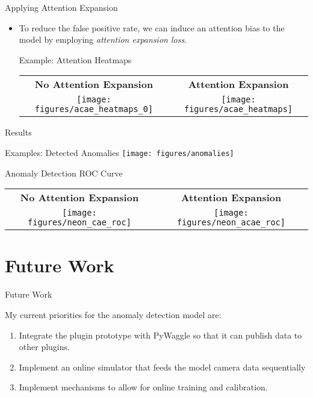\documentclass[10pt]{beamer}
\begin{document}
\begin{frame}{Applying Attention Expansion}

\begin{itemize}
\item To reduce the false positive rate, we can induce an attention bias to the model by employing \textit{attention expansion loss}.\\[0.5cm]

\begin{exampleblock}{Example: Attention Heatmaps}
\begin{tabular}{c | c}
\textbf{No Attention Expansion} & \textbf{Attention Expansion}\\
\texttt{[image: figures/acae\_heatmaps\_0]} & \texttt{[image: figures/acae\_heatmaps]}
\end{tabular}
\end{exampleblock}
\end{itemize}
\end{frame}

\begin{frame}{Results}
\begin{exampleblock}{Examples: Detected Anomalies}
\texttt{[image: figures/anomalies]}
\end{exampleblock}

\begin{exampleblock}{Anomaly Detection ROC Curve}
\begin{tabular}{c | c}
\textbf{No Attention Expansion} & \textbf{Attention Expansion}\\
\texttt{[image: figures/neon\_cae\_roc]} & \texttt{[image: figures/neon\_acae\_roc]}
\end{tabular}
\end{exampleblock}
\end{frame}


\section{Future Work}


\begin{frame}{Future Work}


My current priorities for the anomaly detection model are:

\begin{enumerate}
\item Integrate the plugin prototype with PyWaggle so that it can publish data to other plugins.

\item Implement an online simulator that feeds the model camera data sequentially

\item Implement mechanisms to allow for online training and calibration.
\end{enumerate}

\end{frame}
\end{document}
